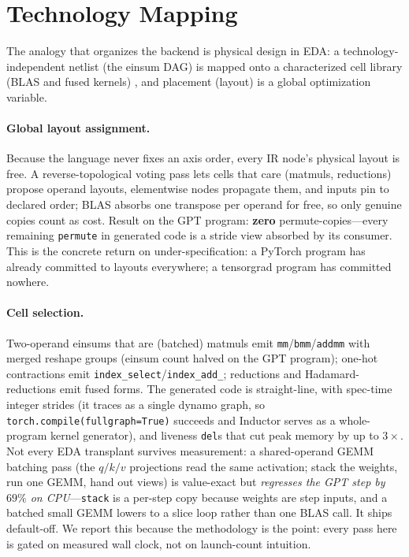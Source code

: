\documentclass[sigplan,10pt,review]{acmart}
\begin{document}
\section{Technology Mapping}\label{sec:techmap}

The analogy that organizes the backend is physical design in EDA: a
technology-independent netlist (the einsum DAG) is mapped onto a
characterized cell library (BLAS \cite{blas} and fused kernels) \cite{dagon}, and placement
(layout) is a global optimization variable.

\paragraph{Global layout assignment.} Because the language never fixes an
axis order, every IR node's physical layout is free. A reverse-topological
voting pass lets cells that care (matmuls, reductions) propose operand
layouts, elementwise nodes propagate them, and inputs pin to declared
order; BLAS absorbs one transpose per operand for free, so only genuine
copies count as cost. Result on the GPT program: \textbf{zero}
permute-copies---every remaining \texttt{permute} in generated code is a
stride view absorbed by its consumer. This is the concrete return on
under-specification: a PyTorch program has already committed to layouts
everywhere; a tensorgrad program has committed nowhere.

\paragraph{Cell selection.} Two-operand einsums that are (batched)
matmuls emit \texttt{mm}/\texttt{bmm}/\texttt{addmm} with merged reshape
groups (einsum count halved on the GPT program); one-hot contractions
emit \texttt{index\_select}/\texttt{index\_add\_}; reductions and
Hadamard-reductions emit fused forms. The generated code is
straight-line, with spec-time integer strides (it traces as a single
dynamo graph, so \texttt{torch.compile(fullgraph=True)} succeeds and
Inductor serves as a whole-program kernel generator), and liveness
\texttt{del}s that cut peak memory by up to $3\times$.
Not every EDA transplant survives measurement: a shared-operand GEMM
batching pass (the $q/k/v$ projections read the same activation; stack
the weights, run one GEMM, hand out views) is value-exact but
\emph{regresses the GPT step by $69\%$ on CPU}---\texttt{stack} is a
per-step copy because weights are step inputs, and a batched small GEMM
lowers to a slice loop rather than one BLAS call. It ships default-off.
We report this because the methodology is the point: every pass here is
gated on measured wall clock, not on launch-count intuition.
\end{document}
